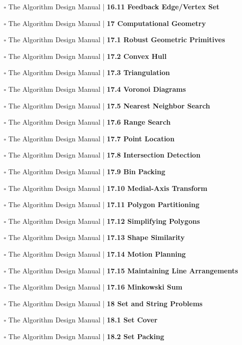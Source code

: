 \documentclass[a4, landscape, 12pt]{article}
\newcommand{\checkbox}{$\square$}%
\begin{document}
\begin{itemize}
{}
\item [\checkbox]  The Algorithm Design Manual | \textbf{ 16.11 Feedback Edge/Vertex Set
}
\item [\checkbox]  The Algorithm Design Manual | \textbf{ 17 Computational Geometry
}
\item [\checkbox]  The Algorithm Design Manual | \textbf{ 17.1 Robust Geometric Primitives
}
\item [\checkbox]  The Algorithm Design Manual | \textbf{ 17.2 Convex Hull
}
\item [\checkbox]  The Algorithm Design Manual | \textbf{ 17.3 Triangulation
}
\item [\checkbox]  The Algorithm Design Manual | \textbf{ 17.4 Voronoi Diagrams
}
\item [\checkbox]  The Algorithm Design Manual | \textbf{ 17.5 Nearest Neighbor Search
}
\item [\checkbox]  The Algorithm Design Manual | \textbf{ 17.6 Range Search
}
\item [\checkbox]  The Algorithm Design Manual | \textbf{ 17.7 Point Location
}
\item [\checkbox]  The Algorithm Design Manual | \textbf{ 17.8 Intersection Detection
}
\item [\checkbox]  The Algorithm Design Manual | \textbf{ 17.9 Bin Packing
}
\item [\checkbox]  The Algorithm Design Manual | \textbf{ 17.10 Medial-Axis Transform
}
\item [\checkbox]  The Algorithm Design Manual | \textbf{ 17.11 Polygon Partitioning
}
\item [\checkbox]  The Algorithm Design Manual | \textbf{ 17.12 Simplifying Polygons
}
\item [\checkbox]  The Algorithm Design Manual | \textbf{ 17.13 Shape Similarity
}
\item [\checkbox]  The Algorithm Design Manual | \textbf{ 17.14 Motion Planning
}
\item [\checkbox]  The Algorithm Design Manual | \textbf{ 17.15 Maintaining Line Arrangements
}
\item [\checkbox]  The Algorithm Design Manual | \textbf{ 17.16 Minkowski Sum
}
\item [\checkbox]  The Algorithm Design Manual | \textbf{ 18 Set and String Problems
}
\item [\checkbox]  The Algorithm Design Manual | \textbf{ 18.1 Set Cover
}
\item [\checkbox]  The Algorithm Design Manual | \textbf{ 18.2 Set Packing
}
\end{itemize}
\end{document}
